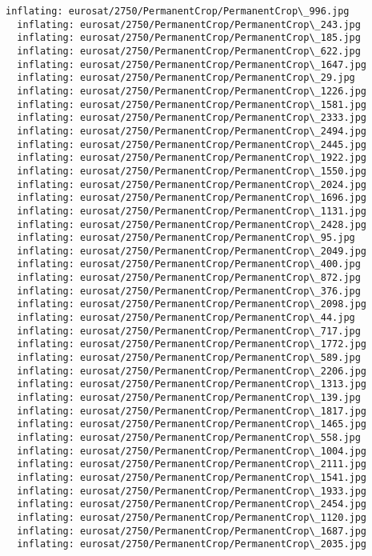 \documentclass[11pt]{article}
\begin{document}
\begin{Verbatim}[commandchars=\\\{\}]
  inflating: eurosat/2750/PermanentCrop/PermanentCrop\_996.jpg
  inflating: eurosat/2750/PermanentCrop/PermanentCrop\_243.jpg
  inflating: eurosat/2750/PermanentCrop/PermanentCrop\_185.jpg
  inflating: eurosat/2750/PermanentCrop/PermanentCrop\_622.jpg
  inflating: eurosat/2750/PermanentCrop/PermanentCrop\_1647.jpg
  inflating: eurosat/2750/PermanentCrop/PermanentCrop\_29.jpg
  inflating: eurosat/2750/PermanentCrop/PermanentCrop\_1226.jpg
  inflating: eurosat/2750/PermanentCrop/PermanentCrop\_1581.jpg
  inflating: eurosat/2750/PermanentCrop/PermanentCrop\_2333.jpg
  inflating: eurosat/2750/PermanentCrop/PermanentCrop\_2494.jpg
  inflating: eurosat/2750/PermanentCrop/PermanentCrop\_2445.jpg
  inflating: eurosat/2750/PermanentCrop/PermanentCrop\_1922.jpg
  inflating: eurosat/2750/PermanentCrop/PermanentCrop\_1550.jpg
  inflating: eurosat/2750/PermanentCrop/PermanentCrop\_2024.jpg
  inflating: eurosat/2750/PermanentCrop/PermanentCrop\_1696.jpg
  inflating: eurosat/2750/PermanentCrop/PermanentCrop\_1131.jpg
  inflating: eurosat/2750/PermanentCrop/PermanentCrop\_2428.jpg
  inflating: eurosat/2750/PermanentCrop/PermanentCrop\_95.jpg
  inflating: eurosat/2750/PermanentCrop/PermanentCrop\_2049.jpg
  inflating: eurosat/2750/PermanentCrop/PermanentCrop\_400.jpg
  inflating: eurosat/2750/PermanentCrop/PermanentCrop\_872.jpg
  inflating: eurosat/2750/PermanentCrop/PermanentCrop\_376.jpg
  inflating: eurosat/2750/PermanentCrop/PermanentCrop\_2098.jpg
  inflating: eurosat/2750/PermanentCrop/PermanentCrop\_44.jpg
  inflating: eurosat/2750/PermanentCrop/PermanentCrop\_717.jpg
  inflating: eurosat/2750/PermanentCrop/PermanentCrop\_1772.jpg
  inflating: eurosat/2750/PermanentCrop/PermanentCrop\_589.jpg
  inflating: eurosat/2750/PermanentCrop/PermanentCrop\_2206.jpg
  inflating: eurosat/2750/PermanentCrop/PermanentCrop\_1313.jpg
  inflating: eurosat/2750/PermanentCrop/PermanentCrop\_139.jpg
  inflating: eurosat/2750/PermanentCrop/PermanentCrop\_1817.jpg
  inflating: eurosat/2750/PermanentCrop/PermanentCrop\_1465.jpg
  inflating: eurosat/2750/PermanentCrop/PermanentCrop\_558.jpg
  inflating: eurosat/2750/PermanentCrop/PermanentCrop\_1004.jpg
  inflating: eurosat/2750/PermanentCrop/PermanentCrop\_2111.jpg
  inflating: eurosat/2750/PermanentCrop/PermanentCrop\_1541.jpg
  inflating: eurosat/2750/PermanentCrop/PermanentCrop\_1933.jpg
  inflating: eurosat/2750/PermanentCrop/PermanentCrop\_2454.jpg
  inflating: eurosat/2750/PermanentCrop/PermanentCrop\_1120.jpg
  inflating: eurosat/2750/PermanentCrop/PermanentCrop\_1687.jpg
  inflating: eurosat/2750/PermanentCrop/PermanentCrop\_2035.jpg

\end{Verbatim}
\end{document}
